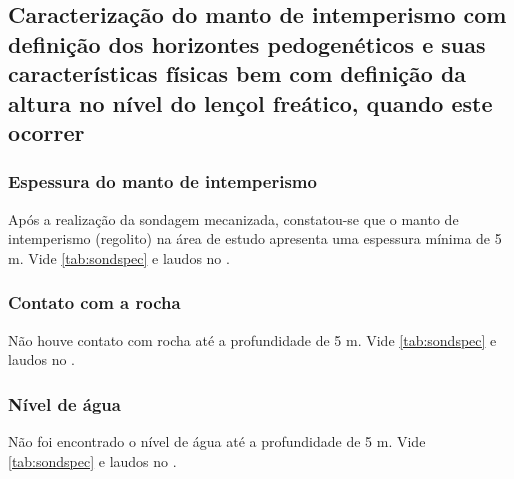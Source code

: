 \subsection{Caracterização do manto de intemperismo com definição dos horizontes pedogenéticos e suas características físicas bem com definição da altura no nível do lençol freático, quando este ocorrer}

\subsubsection*{Espessura do manto de intemperismo}

Após a realização da sondagem mecanizada, constatou-se que o manto de intemperismo (regolito) na área de estudo apresenta uma espessura mínima de 5 m. Vide \cref{tab:sondspec} e
laudos no .

\subsubsection*{Contato com a rocha}

Não houve contato com rocha até a profundidade de 5 m.
Vide \cref{tab:sondspec} e
laudos no .

\subsubsection*{Nível de água}

Não foi encontrado o nível de água até a profundidade de 5 m.
Vide \cref{tab:sondspec} e
laudos no .
